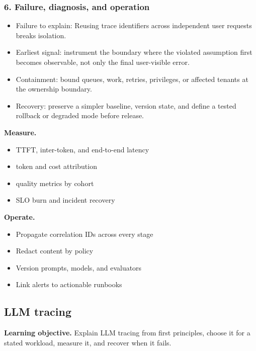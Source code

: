\subsubsection*{6. Failure, diagnosis, and operation}
\begin{itemize}
\item Failure to explain: Reusing trace identifiers across independent user requests breaks isolation.
\item Earliest signal: instrument the boundary where the violated assumption first becomes observable, not only the final user-visible error.
\item Containment: bound queues, work, retries, privileges, or affected tenants at the ownership boundary.
\item Recovery: preserve a simpler baseline, version state, and define a tested rollback or degraded mode before release.
\end{itemize}
\textbf{Measure.}\begin{itemize}
\item TTFT, inter-token, and end-to-end latency
\item token and cost attribution
\item quality metrics by cohort
\item SLO burn and incident recovery
\end{itemize}
\textbf{Operate.}\begin{itemize}
\item Propagate correlation IDs across every stage
\item Redact content by policy
\item Version prompts, models, and evaluators
\item Link alerts to actionable runbooks
\end{itemize}
\subsection{LLM tracing}
\textbf{Learning objective.} Explain LLM tracing from first principles, choose it for a stated workload, measure it, and recover when it fails.
